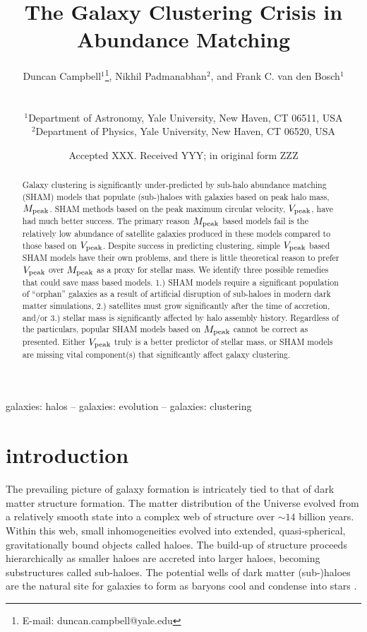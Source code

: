 \documentclass[a4paper,fleqn,usenatbib]{mnras}
\title[The Galaxy Clustering Crisis]{The Galaxy Clustering Crisis in Abundance Matching}
\author[Campbell et al.]
{\parbox[t]{\textwidth}{
Duncan Campbell$^{1}$\thanks{E-mail: duncan.campbell@yale.edu},
Nikhil Padmanabhan$^{2}$, and 
Frank C. van den Bosch$^{1}$
} \\
\vspace*{3pt} \\
$^{1}$Department of Astronomy, Yale University, New Haven, CT 06511, USA\\
$^{2}$Department of Physics, Yale University, New Haven, CT 06520, USA \\
}
\date{Accepted XXX. Received YYY; in original form ZZZ}
\begin{document}
\label{firstpage}
\pagerange{\pageref{firstpage}--\pageref{lastpage}}
\maketitle

\begin{abstract}
Galaxy clustering is significantly under-predicted by sub-halo abundance matching (SHAM) models that populate (sub-)haloes with galaxies based on peak halo mass, $M_{\rm peak}$.  SHAM methods based on the peak maximum circular velocity, $V_{\rm peak}$, have had much better success.  The primary reason $M_{\rm peak}$ based models fail is the relatively low abundance of satellite galaxies produced in these models compared to those based on $V_{\rm peak}$.  Despite success in predicting clustering, simple $V_{\rm peak}$ based SHAM models have their own problems, and there is little theoretical reason to prefer $V_{\rm peak}$ over $M_{\rm peak}$ as a proxy for stellar mass.  We identify three possible remedies that could save mass based models.  1.) SHAM models require a significant population of ``orphan'' galaxies as a result of artificial disruption of sub-haloes in modern dark matter simulations, 2.) satellites must grow significantly after the time of accretion, and/or 3.) stellar mass is significantly affected by halo assembly history.  Regardless of the particulars, popular SHAM models based on $M_{\rm peak}$ cannot be correct as presented.  Either $V_{\rm peak}$ truly is a better predictor of stellar mass, or SHAM models are missing vital component(s) that significantly affect galaxy clustering.
\end{abstract}

\begin{keywords}
galaxies: halos -- galaxies: evolution -- galaxies: clustering
\end{keywords}

\section{introduction}

The prevailing picture of galaxy formation is intricately tied to that of dark matter structure formation.  The matter distribution of the Universe evolved from a relatively smooth state into a complex web of structure over $\sim 14$ billion years.  Within this web, small inhomogeneities evolved into extended, quasi-spherical, gravitationally bound objects called haloes.  The build-up of structure proceeds hierarchically as smaller haloes are accreted into larger haloes, becoming substructures called sub-haloes.  The potential wells of dark matter (sub-)haloes are the natural site for galaxies to form as baryons cool and condense into stars \citep{Rees:1977gr, White:1978uk, Fall:1980br}.  
\end{document}
